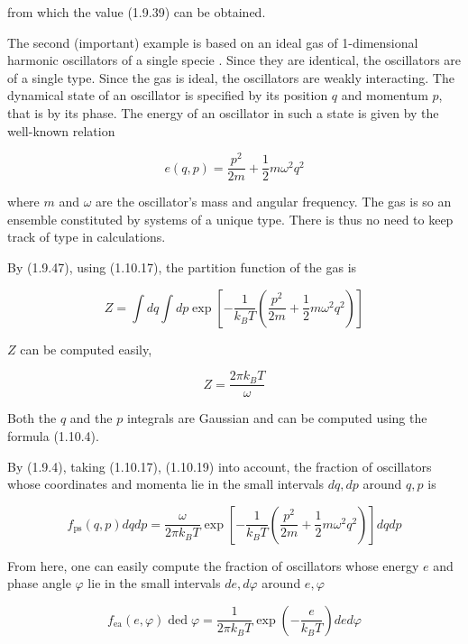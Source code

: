 \documentclass{article}
\begin{document}
from which the value (1.9.39) can be obtained.

The second (important) example is based on an ideal gas of 1-dimensional harmonic oscillators of a single specie . Since they are identical, the oscillators are of a single type. Since the gas is ideal, the oscillators are weakly interacting. The dynamical state of an oscillator is specified by its position $q$ and momentum $p$, that is by its phase. The energy of an oscillator in such a state is given by the well-known relation
 
\begin{equation*}
e(q, p)=\frac{p^{2}}{2 m}+\frac{1}{2} m \omega^{2} q^{2} \tag{1.10.17}
\end{equation*}
 
where $m$ and $\omega$ are the oscillator's mass and angular frequency. The gas is so an ensemble constituted by systems of a unique type. There is thus no need to keep track of type in calculations.

By (1.9.47), using (1.10.17), the partition function of the gas is
 
\begin{equation*}
Z=\int d q \int d p \exp \left[-\frac{1}{k_{B} T}\left(\frac{p^{2}}{2 m}+\frac{1}{2} m \omega^{2} q^{2}\right)\right] \tag{1.10.18}
\end{equation*}
 
$Z$ can be computed easily,
 
\begin{equation*}
Z=\frac{2 \pi k_{B} T}{\omega} \tag{1.10.19}
\end{equation*}
 
Both the $q$ and the $p$ integrals are Gaussian and can be computed using the formula (1.10.4).

By (1.9.4), taking (1.10.17), (1.10.19) into account, the fraction of oscillators whose coordinates and momenta lie in the small intervals $d q, d p$ around $q, p$ is
 
\begin{equation*}
f_{\mathrm{ps}}(q, p) d q d p=\frac{\omega}{2 \pi k_{B} T} \exp \left[-\frac{1}{k_{B} T}\left(\frac{p^{2}}{2 m}+\frac{1}{2} m \omega^{2} q^{2}\right)\right] d q d p \tag{1.10.20}
\end{equation*}
 

From here, one can easily compute the fraction of oscillators whose energy $e$ and phase angle $\varphi$ lie in the small intervals $d e, d \varphi$ around $e, \varphi$
 
\begin{equation*}
f_{\mathrm{ea}}(e, \varphi) \operatorname{ded} \varphi=\frac{1}{2 \pi k_{B} T} \exp \left(-\frac{e}{k_{B} T}\right) d e d \varphi \tag{1.10.21}
\end{equation*}
 
\end{document}

